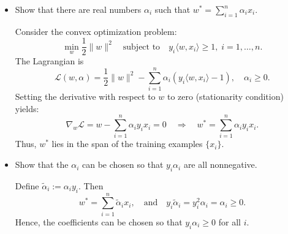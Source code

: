 \documentclass[a4paper]{article}
\begin{document}
\begin{itemize}
    \item Show that there are real numbers $\alpha_i$ such that $w^* = \sum_{i=1}^n \alpha_i x_i$.


Consider the convex optimization problem:
\[
\min_{w} \frac{1}{2}\|w\|^2
\quad \text{subject to} \quad
y_i \langle w, x_i \rangle \ge 1, \; i = 1, \ldots, n.
\]
The Lagrangian is
\[
\mathcal{L}(w, \alpha) = \frac{1}{2}\|w\|^2 - \sum_{i=1}^n \alpha_i (y_i \langle w, x_i \rangle - 1),
\quad \alpha_i \ge 0.
\]
Setting the derivative with respect to \( w \) to zero (stationarity condition) yields:
\[
\nabla_w \mathcal{L} = w - \sum_{i=1}^n \alpha_i y_i x_i = 0
\quad \Rightarrow \quad
w^* = \sum_{i=1}^n \alpha_i y_i x_i.
\]
Thus, \( w^* \) lies in the span of the training examples \( \{x_i\} \).


    \item Show that the $\alpha_i$ can be chosen so that $y_i \alpha_i$ are all nonnegative.

Define \( \tilde{\alpha}_i := \alpha_i y_i \).
Then
\[
w^* = \sum_{i=1}^n \tilde{\alpha}_i x_i,
\quad \text{and} \quad
y_i \tilde{\alpha}_i = y_i^2 \alpha_i = \alpha_i \ge 0.
\]
Hence, the coefficients can be chosen so that \( y_i \alpha_i \ge 0 \) for all \( i \).

\end{itemize}
\end{document}
